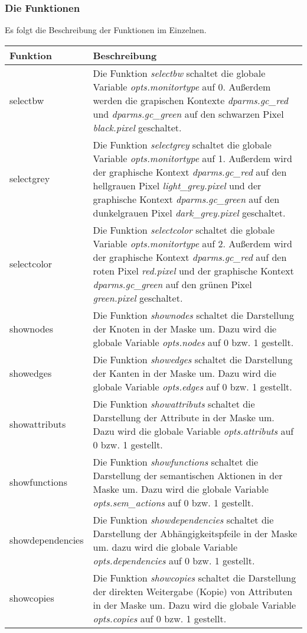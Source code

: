 \subsubsection{Die Funktionen}

Es folgt die Beschreibung der Funktionen im Einzelnen.

\bigskip
\begin{tabular}{|l|p{9.0cm}|}
\hline
Funktion & Beschreibung \\
\hline
selectbw &
Die Funktion {\it selectbw} schaltet die globale Variable {\it opts.monitortype} auf 0. Au\ss{}erdem werden die grapischen Kontexte {\it dparms.gc\_red}
und {\it dparms.gc\_green} auf den schwarzen Pixel {\it black.pixel} geschaltet. \\ selectgrey & Die Funktion {\it selectgrey} schaltet die globale
Variable {\it opts.monitortype} auf 1. Au\ss{}erdem wird der graphische Kontext {\it dparms.gc\_red} auf den hellgrauen Pixel {\it light\_grey.pixel}
und der graphische Kontext {\it dparms.gc\_green} auf den dunkelgrauen Pixel {\it dark\_grey.pixel} geschaltet. \\ selectcolor & Die Funktion {\it
selectcolor} schaltet die globale Variable {\it opts.monitortype} auf 2. Au\ss{}erdem wird der graphische Kontext {\it dparms.gc\_red} auf den roten
Pixel {\it red.pixel} und der graphische Kontext {\it dparms.gc\_green} auf den gr\"unen Pixel {\it green.pixel} geschaltet. \\ shownodes & Die
Funktion {\it shownodes} schaltet die Darstellung der Knoten in der Maske um. Dazu wird die globale Variable {\it opts.nodes} auf 0 bzw. 1 gestellt.
\\ showedges & Die Funktion {\it showedges} schaltet die Darstellung der Kanten in der Maske um. Dazu wird die globale Variable {\it opts.edges} auf 0
bzw. 1 gestellt.\\ showattributs & Die Funktion {\it showattributs} schaltet die Darstellung der Attribute in der Maske um. Dazu wird die globale
Variable {\it opts.attributs} auf 0 bzw. 1 gestellt. \\ showfunctions & Die Funktion {\it showfunctions} schaltet die Darstellung der semantischen
Aktionen in der Maske um. Dazu wird die globale Variable {\it opts.sem\_actions} auf 0 bzw. 1 gestellt. \\ showdependencies & Die Funktion {\it
showdependencies} schaltet die Darstellung der Abh\"angigkeitspfeile in der Maske um. dazu wird die globale Variable {\it opts.dependencies} auf 0 bzw.
1 gestellt. \\ showcopies & Die Funktion {\it showcopies} schaltet die Darstellung der direkten Weitergabe (Kopie) von Attributen in der Maske um.
Dazu wird die globale Variable {\it opts.copies} auf 0 bzw. 1 gestellt. \\
\hline
\end{tabular}

